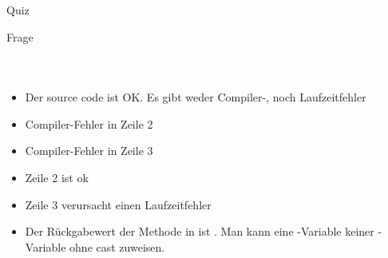\documentclass[usepdftitle=false,hyperref={pdfpagelabels=false}]{beamer}
\begin{document}
\begin{frame}{Quiz}
    \begin{block}{Frage}
    \begin{minipage}[b]{0.45\linewidth}
        \inputminted[linenos=false, numbersep=5pt, tabsize=4, fontsize=\tiny]{java}{Basket.java}
    \end{minipage}
    \hspace{0.5cm}
    \begin{minipage}[b]{0.45\linewidth}
        \inputminted[linenos=false, numbersep=5pt, tabsize=4, fontsize=\tiny,]{java}{Fruit.java}
        \inputminted[linenos=true, numbersep=5pt, tabsize=4, fontsize=\tiny, label=In main, frame=lines]{java}{Generics-quiz-main.java}
    \end{minipage}
    \end{block}

    \begin{overprint}
    \begin{itemize}
        \item Der source code ist OK. Es gibt weder Compiler-, noch Laufzeitfehler
        \item Compiler-Fehler in Zeile 2
        \item Compiler-Fehler in Zeile 3
    \end{itemize}
        \begin{itemize}
            \item Zeile 2 ist ok
            \item Zeile 3 verursacht einen Laufzeitfehler
            \item Der Rückgabewert der Methode  
                 in  ist . 
                 Man kann eine -Variable 
                 keiner -Variable ohne cast zuweisen.
        \end{itemize}
    \end{overprint}
\end{frame}
\end{document}
